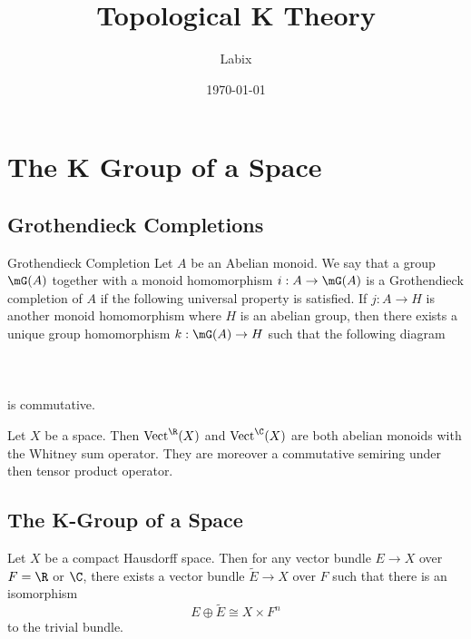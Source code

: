 \documentclass[a4paper]{article}
\title{Topological K Theory}
\author{Labix}
\date{\today}
\begin{document}
\maketitle
\begin{abstract}
\end{abstract}
\pagebreak
\tableofcontents

\pagebreak
\section{The K Group of a Space}
\subsection{Grothendieck Completions}
\begin{defn}{Grothendieck Completion}{} Let $A$ be an Abelian monoid. We say that a group $\mG(A)$ together with a monoid homomorphism $i:A\to\mG(A)$ is a Grothendieck completion of $A$ if the following universal property is satisfied. If $j:A\to H$ is another monoid homomorphism where $H$ is an abelian group, then there exists a unique group homomorphism $k:\mG(A)\to H$ such that the following diagram \\~\\
\\~\\
is commutative. 
\end{defn}

\begin{prp}{}{} Let $X$ be a space. Then $\text{Vect}^\R(X)$ and $\text{Vect}^\C(X)$ are both abelian monoids with the Whitney sum operator. They are moreover a commutative semiring under then tensor product operator. 
\end{prp}

\subsection{The K-Group of a Space}
\begin{thm}{}{} Let $X$ be a compact Hausdorff space. Then for any vector bundle $E\to X$ over $F=\R$ or $\C$, there exists a vector bundle $\widetilde{E}\to X$ over $F$ such that there is an isomorphism $$E\oplus\widetilde{E}\cong X\times F^n$$ to the trivial bundle. 
\end{thm}
\end{document}
